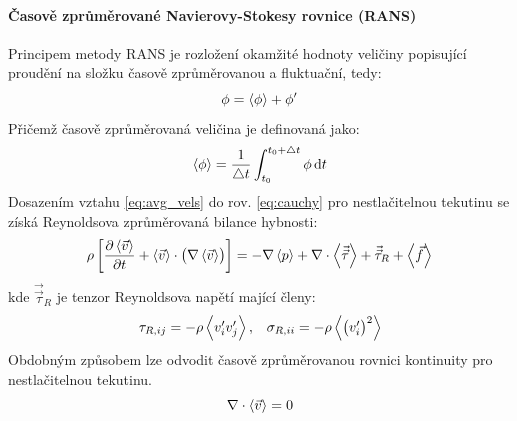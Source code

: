 \paragraph{Časově zprůměrované Navierovy-Stokesy rovnice (RANS)}
Principem metody RANS je rozložení okamžité hodnoty veličiny popisující proudění na složku časově zprůměrovanou a fluktuační, tedy:
\begin{equation}
  \phi = \left< \phi \right> + \phi'
  \label{eq:avg_vels}
\end{equation}
Přičemž časově zprůměrovaná veličina je definovaná jako:
\begin{equation}
  \left< \phi \right>  = \frac{1}{\bigtriangleup t} \int_{t_{0}}^{t_{0} + \bigtriangleup t} \phi\,\mathrm{d}t
  \label{eq:phi_avg}
\end{equation}
Dosazením vztahu \ref{eq:avg_vels} do rov. \ref{eq:cauchy} pro nestlačitelnou tekutinu se získá Reynoldsova zprůměrovaná bilance hybnosti:  
\begin{equation}
    \rho \left[ \frac{\partial \left< \vec{v} \right>}{\partial t} + \left< \vec{v} \right> \cdot \left( \nabla  \left< \vec{v} \right> \right) \right] = -\nabla \left< p \right> +  \nabla \cdot \left< \vec{\vec{\tau}} \right> + \vec{\vec{\tau}}_{R} + \left< \vec{f} \right>
  	\label{eq:cauchy_avg}
\end{equation} 
kde $\vec{\vec{\tau}}_{R}$ je tenzor Reynoldsova napětí mající členy: 
\begin{equation}
    \begin{array}{cc}
      \tau_{R,ij} = -\rho\left< v_{i}'v_{j}' \right>, & \sigma_{R,ii} = -\rho\left< \left(v_{i}'\right)^{2} \right>
      \end{array}
      \label{eq:rey_stress}
\end{equation}
Obdobným způsobem lze odvodit časově zprůměrovanou rovnici kontinuity pro nestlačitelnou tekutinu.
\begin{equation}
	\nabla \cdot \left< \vec{v} \right> = 0
	\label{eq:conti1simp_avg}
\end{equation}  

